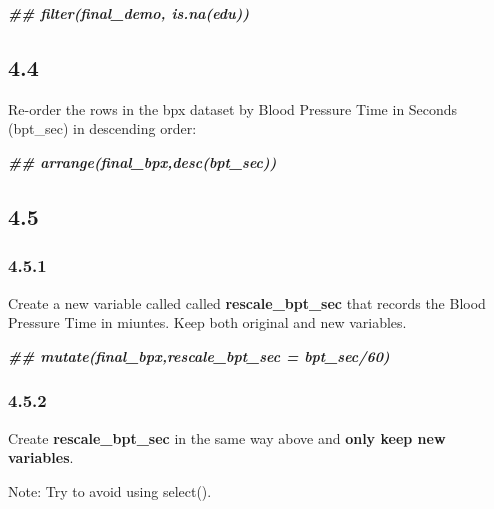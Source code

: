 \documentclass[
]{book}
\newenvironment{Shaded}{\begin{snugshade}}{\end{snugshade}}
\newcommand{\DocumentationTok}[1]{\textcolor[rgb]{0.56,0.35,0.01}{\textbf{\textit{#1}}}}
\begin{document}
\begin{Shaded}
\begin{Highlighting}[]
\DocumentationTok{\#\# filter(final\_demo, is.na(edu))}
\end{Highlighting}
\end{Shaded}

\hypertarget{section-20}{%
\subsection{4.4}\label{section-20}}

Re-order the rows in the bpx dataset by Blood Pressure Time in Seconds (bpt\_sec) in descending order:

\begin{Shaded}
\begin{Highlighting}[]
\DocumentationTok{\#\# arrange(final\_bpx,desc(bpt\_sec))}
\end{Highlighting}
\end{Shaded}

\hypertarget{section-21}{%
\subsection{4.5}\label{section-21}}

\hypertarget{section-22}{%
\subsubsection{4.5.1}\label{section-22}}

Create a new variable called called \textbf{rescale\_bpt\_sec} that records the Blood Pressure Time in miuntes. Keep both original and new variables.

\begin{Shaded}
\begin{Highlighting}[]
\DocumentationTok{\#\#  mutate(final\_bpx,rescale\_bpt\_sec = bpt\_sec/60)}
\end{Highlighting}
\end{Shaded}

\hypertarget{section-23}{%
\subsubsection{4.5.2}\label{section-23}}

Create \textbf{rescale\_bpt\_sec} in the same way above and \textbf{only keep new variables}.

Note: Try to avoid using select().
\end{document}
